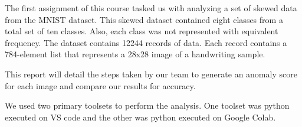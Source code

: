 The first assignment of this course tasked us with analyzing a set of skewed data from the MNIST dataset. This skewed dataset contained eight classes from a total set of ten classes. Also, each class was not represented with equivalent frequency. The dataset contains 12244 records of data. Each record contains a 784-element list that represents a 28x28 image of a handwriting sample.

This report will detail the steps taken by our team to generate an anomaly score for each image and compare our results for accuracy.

We used two primary toolsets to perform the analysis. One toolset was python executed on VS code and the other was python executed on Google Colab.